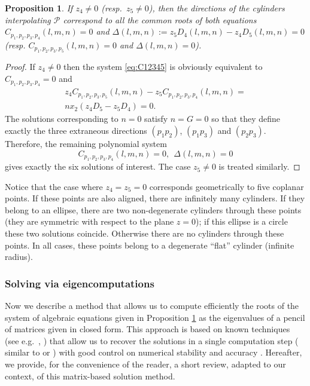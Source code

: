 \documentclass[5p]{elsarticle}
\newtheorem{prop}[thm]{Proposition}
\newcommand\Pc{\mathcal P}
\newcommand{\com}[1]{{\color{black} #1}}
\newcommand{\lb}[1]{{\color{black} #1}}
\begin{document}
\begin{prop}\label{eq:systCD} If $z_4\neq 0$ (resp.~$z_5\neq0$), then the directions of the cylinders interpolating $\Pc$ \com{correspond to} all the common roots of both equations $C_{p_1,p_2,p_3,p_4}(l,m,n)=0$  and 
	$\Delta(l,m,n):=z_{5}D_{4}(l,m,n)-z_{4}D_{5}(l,m,n) = 0$ (resp. $C_{p_1,p_2,p_3,p_5}(l,m,n)=0$ and $\Delta(l,m,n)=0$).	
\end{prop}
\begin{proof} If $z_4\neq 0$ then the system \eqref{eq:C12345} is obviously equivalent to $C_{p_1,p_2,p_3,p_4}=0$ and
\begin{multline*}
	z_4C_{p_1,p_2,p_3,p_5}(l,m,n)-z_5C_{p_1,p_2,p_3,p_4}(l,m,n)= \\ nx_2(z_4D_5-z_5D_4)=0.
	\end{multline*}
The solutions corresponding to $n=0$ satisfy $n=G=0$ so that they define exactly the three extraneous 	directions $(p_{1}p_{2})$, $(p_{1}p_{3})$ and $(p_{2}p_{3})$. 
Therefore, the remaining polynomial system 
\begin{equation}\label{eq:andre}
C_{p_1,p_2,p_3,p_4}(l,m,n)=0, \ \ \Delta(l,m,n)=0	
\end{equation}
gives exactly the six solutions of interest. The case $z_5\neq 0$ is treated similarly.
\end{proof}

\com{Notice} that the case where $z_4=z_5=0$ corresponds geometrically to five coplanar points. If these points are also aligned, \com{there are} infinitely many cylinders. 
\com{
If they belong to an \com{ellipse}, there are two \com{non-degenerate} cylinders \com{through} these points (they are symmetric with respect to the plane $z=0$); if this ellipse is a circle these two solutions coincide. Otherwise there are no cylinders through these points.
In all cases, \com{these points} belong to a \com{degenerate} ``flat'' cylinder (infinite radius).
}
\subsubsection{Solving via eigencomputations}\label{subsec:cyl5P}

\com{Now we describe a method that allows us to compute efficiently the roots of the system of algebraic equations given in Proposition \ref{eq:systCD} as the eigenvalues of a pencil of matrices given in closed form. This approach is based on known techniques (see e.g.~\cite{Stetter:1996:MEH:242961.242966}, \cite[\S 1]{Cox05})  \lb{that allow us} to recover the solutions in a single computation step (\lb{similar to} \cite[Appendix]{Devillers02} or \cite{BKM05}) \lb{with good control on}  numerical stability and accuracy \cite{EM95}. Hereafter, \lb{we provide, for the convenience of the reader, a short review, adapted to our context, of this matrix-based solution method}.} 
\end{document}
